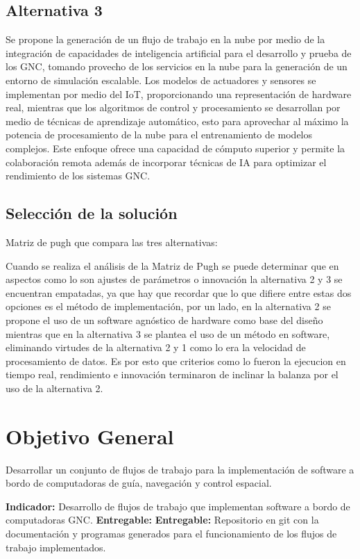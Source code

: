 \documentclass[12pt]{article}
\begin{document}
\subsection{Alternativa 3}
Se propone la generación de un flujo de trabajo en la nube por medio de la integración de capacidades de inteligencia artificial para el desarrollo y prueba de los GNC, tomando provecho de los servicios en la nube para la generación de un entorno de simulación escalable. Los modelos de actuadores y sensores se implementan por medio del IoT, proporcionando una representación de hardware real, mientras que los algoritmos de control y procesamiento se desarrollan por medio de técnicas de aprendizaje automático, esto para aprovechar al máximo la potencia de procesamiento de la nube para el entrenamiento de modelos complejos. Este enfoque ofrece una capacidad de cómputo superior y permite la colaboración remota además de incorporar técnicas de IA para optimizar el rendimiento de los sistemas GNC.


\subsection{Selección de la solución}

Matriz de pugh que compara las tres alternativas:


Cuando se realiza el análisis de la Matriz de Pugh se puede determinar que en aspectos como lo son ajustes de parámetros o innovación la alternativa 2 y 3 se encuentran empatadas, ya que hay que recordar que lo que difiere entre estas dos opciones es el método de implementación, por un lado, en la alternativa 2 se propone el uso de un software agnóstico de hardware como base del diseño mientras que en la alternativa 3 se plantea el uso de un método en software, eliminando virtudes de la alternativa 2 y 1 como lo era la velocidad de procesamiento de datos. Es por esto que criterios como lo fueron la ejecucion en tiempo real, rendimiento e innovación terminaron de inclinar la balanza por el uso de la alternativa 2.

\section{Objetivo General}

Desarrollar un conjunto de flujos de trabajo para la implementación de software a bordo de computadoras de guía, navegación y control espacial.

\textbf{Indicador:} Desarrollo de flujos de trabajo que implementan software a bordo de computadoras GNC.\newline
\textbf{Entregable:} \textbf{Entregable:} Repositorio en git con la documentación y programas generados para el funcionamiento de los flujos de trabajo implementados.
\end{document}
